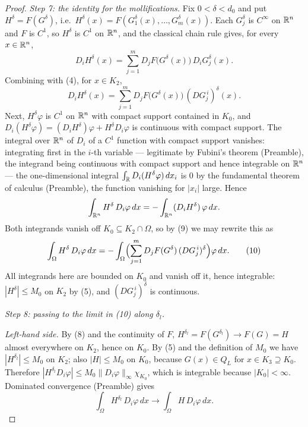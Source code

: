 \begin{proof}
\emph{Step 7: the identity for the mollifications.}  Fix $0<\delta<d_0$ and put
$H^\delta=F(G^\delta)$, i.e.\ $H^\delta(x)=F(G_1^\delta(x),\dots,G_m^\delta(x))$.
Each $G_j^\delta$ is $C^\infty$ on $\mathbb{R}^n$ and $F$ is $C^1$, so $H^\delta$ is
$C^1$ on $\mathbb{R}^n$, and the classical chain rule gives, for every $x\in\mathbb{R}^n$,
\[
D_iH^\delta(x)=\sum_{j=1}^mD_jF\bigl(G^\delta(x)\bigr)\,D_iG_j^\delta(x) .
\]
Combining with (4), for $x\in K_2$,
\[
D_iH^\delta(x)=\sum_{j=1}^mD_jF\bigl(G^\delta(x)\bigr)\,(DG_j^{\,i})^\delta(x) .
\tag{9}
\]
Next, $H^\delta\varphi$ is $C^1$ on $\mathbb{R}^n$ with compact support contained in
$K_0$, and $D_i(H^\delta\varphi)=(D_iH^\delta)\varphi+H^\delta D_i\varphi$ is
continuous with compact support.  The integral over $\mathbb{R}^n$ of $D_i$ of a $C^1$
function with compact support vanishes: integrating first in the $i$-th
variable --- legitimate by Fubini's theorem (Preamble), the integrand being
continuous with compact support and hence integrable on $\mathbb{R}^n$ --- the
one-dimensional integral $\int_{\mathbb{R}} D_i(H^\delta\varphi)\,dx_i$ is $0$ by the
fundamental theorem of calculus (Preamble), the function vanishing for $|x_i|$
large.  Hence
\[
\int_{\mathbb{R}^n}H^\delta\,D_i\varphi\,dx=-\int_{\mathbb{R}^n}(D_iH^\delta)\,\varphi\,dx .
\]
Both integrands vanish off $K_0\subseteq K_2\cap\Omega$, so by (9) we may
rewrite this as
\[
\int_\Omega H^\delta\,D_i\varphi\,dx
=-\int_\Omega\Bigl(\sum_{j=1}^mD_jF(G^\delta)\,(DG_j^{\,i})^\delta\Bigr)\varphi\,dx .
\tag{10}
\]
All integrands here are bounded on $K_0$ and vanish off it, hence integrable:
$|H^\delta|\le M_0$ on $K_2$ by (5), and $(DG_j^{\,i})^\delta$ is continuous.

\emph{Step 8: passing to the limit in (10) along $\delta_l$.}

\emph{Left-hand side.}  By (8) and the continuity of $F$,
$H^{\delta_l}=F(G^{\delta_l})\to F(G)=H$ almost everywhere on $K_2$, hence on
$K_0$.  By (5) and the definition of $M_0$ we have $|H^{\delta_l}|\le M_0$ on
$K_2$; also $|H|\le M_0$ on $K_0$, because $G(x)\in Q_L$ for $x\in K_3\supseteq
K_0$.  Therefore
$|H^{\delta_l}D_i\varphi|\le M_0\|D_i\varphi\|_\infty\chi_{K_0}$, which is
integrable because $|K_0|<\infty$.  Dominated convergence (Preamble) gives
\[
\int_\Omega H^{\delta_l}\,D_i\varphi\,dx\longrightarrow\int_\Omega H\,D_i\varphi\,dx .
\]


\end{proof}
